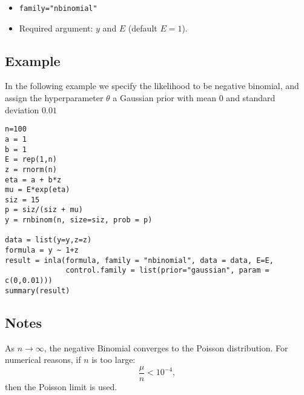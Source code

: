 \documentclass[a4paper,11pt]{article}
\begin{document}
\begin{itemize}
\item \texttt{family="nbinomial"}
\item Required argument: $y$ and $E$ (default $E=1$).
\end{itemize}

\subsection*{Example}
In the following example we specify the likelihood to be negative binomial, and assign the hyperparameter $\theta$ a Gaussian prior with mean $0$ and standard deviation $0.01$
 
\begin{verbatim}
n=100
a = 1
b = 1
E = rep(1,n)
z = rnorm(n)
eta = a + b*z
mu = E*exp(eta)
siz = 15
p = siz/(siz + mu)
y = rnbinom(n, size=siz, prob = p)

data = list(y=y,z=z)
formula = y ~ 1+z
result = inla(formula, family = "nbinomial", data = data, E=E,
              control.family = list(prior="gaussian", param = c(0,0.01)))
summary(result)
\end{verbatim}

\subsection*{Notes}

As $n\rightarrow\infty$, the negative Binomial converges to the
Poisson distribution. For numerical reasons, if $n$ is too large:
\begin{displaymath}
    \frac{\mu}{n} < 10^{-4},
\end{displaymath}
then the Poisson limit is used.
\end{document}
